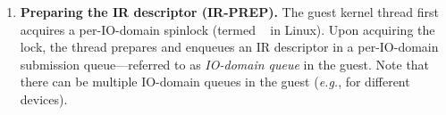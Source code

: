 \begin{enumerate}[leftmargin=*]
\item {\bf Preparing the IR descriptor (IR-PREP).} 
The guest kernel thread first acquires 
    a per-IO-domain 
    spinlock (termed ~\cite{dmar_domain.cache_lock} in Linux). 
    Upon acquiring the lock, the thread prepares and enqueues 
    an IR descriptor in a per-IO-domain submission queue---referred 
    to as {\it IO-domain queue} in the guest. 
Note that there can be multiple IO-domain queues in the guest
    (\textit{e.g.}, for different devices).


\end{enumerate}
